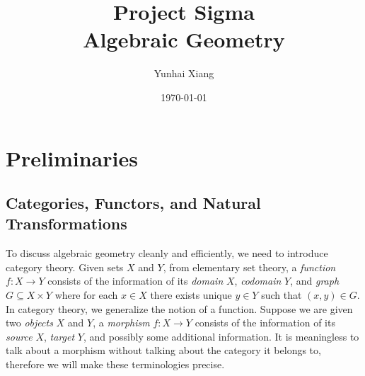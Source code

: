\documentclass[11pt]{book}
\title{
\vspace{-2.0cm}
\Large{Project Sigma}\\
\vspace{1cm}
\huge{\bf{Algebraic Geometry}}
\vspace{3cm}}
\author{Yunhai Xiang}
\date{\today}
\begin{document}
\maketitle
\doublespacing
\tableofcontents
\singlespacing
\newpage
\chapter{Preliminaries}

\section{Categories, Functors, and Natural Transformations}
To discuss algebraic geometry cleanly and efficiently, we need to introduce category theory. Given sets $X$ and $Y$, from elementary set theory, a \textit{function} $f:X\rightarrow Y$ consists of the information of its \textit{domain} $X$, \textit{codomain} $Y$, and \textit{graph} $G\subseteq X\times Y$ where for each $x\in X$ there exists unique $y\in Y$ such that $(x,y)\in G$. In category theory, we generalize the notion of a function. Suppose we are given two \textit{objects} $X$ and $Y$, a \textit{morphism} $f:X\rightarrow Y$ consists of the information of its \textit{source} $X$, \textit{target} $Y$, and possibly some additional information. It is meaningless to talk about a morphism without talking about the category it belongs to, therefore we will make these terminologies precise.
\end{document}
